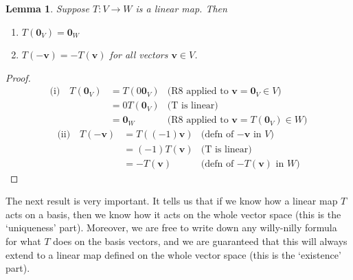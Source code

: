 \documentclass[a4paper,11pt]{book}
\newtheorem{lemma}[theorem]{Lemma}
\theoremstyle{definition}
\newcommand{\ve}[1]{\mathbf{#1}}
\begin{document}
\begin{lemma} \label{lin_map_zero_to_zero} Suppose $T : V \rightarrow W$ is a linear map. Then
\begin{enumerate}
	\item $T(\ve{0}_V) = \ve{0}_W$
	\item $T(-\ve{v}) = - T(\ve{v})$ for all vectors $\ve{v} \in V$.
\end{enumerate}
\end{lemma}
\begin{proof} 
\begin{align*}
 \mbox{(i)} \quad T(\ve{0}_V) &= T( 0 \ve{0}_V) & \mbox{(R8 applied to $\ve{v} = \ve{0}_V \in V$)} \\
  &= 0T(\ve{0}_V) & \mbox{(T is linear)} \\
  &= \ve{0}_W & \mbox{(R8 applied to $\ve{v} = T(\ve{0}_V) \in W$)}
  \end{align*}
 \begin{align*}
   \mbox{(ii)} \quad  T(-\ve{v}) &= T( (-1) \ve{v}) & \mbox{(defn of $-\ve{v}$ in $V$)} \\
    &= (-1) T(\ve{v}) & \mbox{(T is linear)} \\
    &= - T(\ve{v}) & \mbox{(defn of $-T(\ve{v})$ in $W$)}
 \end{align*}
\end{proof}
The next result is very important. It tells us that if we know how a linear map $T$ acts on a basis, then we know how it acts on the whole vector space (this is the `uniqueness' part). Moreover, we are free to write down any willy-nilly formula for what $T$ does on the basis vectors, and we are guaranteed that this will always extend to a linear map defined on the whole vector space (this is the `existence' part).
\end{document}
